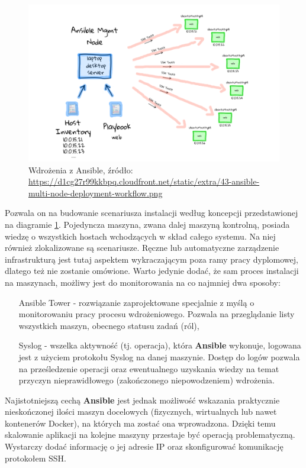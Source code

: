     \begin{figure}[h]
        \centering
        \includegraphics[width=1.0\textwidth]{images/43-ansible-multi-node-deployment-workflow}
        \caption[Wdrożenia z Ansible]{
            Wdrożenia z Ansible, 
            źródło: \url{https://d1cg27r99kkbpq.cloudfront.net/static/extra/43-ansible-multi-node-deployment-workflow.png}
        }
        \label{chapter:application:architecture:installation:ansible_diagram}
    \end{figure}
     
    Pozwala on na budowanie scenariusza instalacji według koncepcji przedstawionej na diagramie 
    \ref{chapter:application:architecture:installation:ansible_diagram}. Pojedyncza maszyna, zwana dalej
    maszyną kontrolną, posiada wiedzę o wszystkich hostach wchodzących w skład całego systemu. Na niej
    również zlokalizowane są scenariusze. Ręczne lub automatyczne zarządzenie infrastrukturą jest
    tutaj aspektem wykraczającym poza ramy pracy dyplomowej, dlatego też nie zostanie omówione. 
    Warto jedynie dodać, że sam proces instalacji na maszynach, możliwy jest do monitorowania na co najmniej
    dwa sposoby:
    
    \begin{itemize}
        \item[Ansible Tower] - rozwiązanie zaprojektowane specjalnie z myślą o monitorowaniu pracy
        procesu wdrożeniowego. Pozwala na przeglądanie listy wszystkich maszyn, obecnego statusu
        zadań (ról),
        \item[Syslog] - wszelka aktywność (tj. operacja), która \textbf{Ansible} wykonuje, logowana jest
        z użyciem protokołu Syslog na danej maszynie. Dostęp do logów pozwala na prześledzenie operacji oraz
        ewentualnego uzyskania wiedzy na temat przyczyn nieprawidłowego (zakończonego niepowodzeniem) wdrożenia.
    \end{itemize}
    
    Najistotniejszą cechą \textbf{Ansible} jest jednak możliwość wskazania praktycznie nieskończonej
    ilości maszyn docelowych (fizycznych, wirtualnych lub nawet kontenerów Docker), na których ma zostać ona wprowadzona. 
    Dzięki temu skalowanie aplikacji na kolejne maszyny przestaje być operacją problematyczną. Wystarczy dodać 
    informację o jej adresie IP oraz skonfigurować komunikację protokołem SSH.
